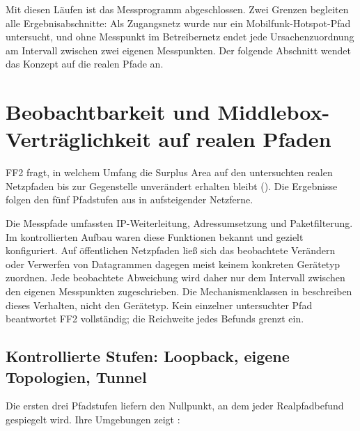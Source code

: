 Mit diesen Läufen ist das Messprogramm abgeschlossen. Zwei Grenzen begleiten alle Ergebnisabschnitte: Als
Zugangsnetz wurde nur ein Mobilfunk-Hotspot-Pfad untersucht, und ohne Messpunkt im Betreibernetz endet
jede Ursachenzuordnung am Intervall zwischen zwei eigenen Messpunkten. Der folgende Abschnitt wendet das
Konzept auf die realen Pfade an.

\section[Beobachtbarkeit und Middlebox-Verträglichkeit auf realen Pfaden]%
{Beobachtbarkeit und Middlebox-\\Verträglichkeit auf realen Pfaden}
\label{sec:beobachtbarkeit-eval}

FF2 fragt, in welchem Umfang die Surplus Area auf den untersuchten realen Netz\-pfaden bis zur Gegenstelle
unverändert erhalten bleibt (). Die Ergebnisse folgen den fünf Pfadstufen aus
 in aufsteigender Netzferne.

Die Messpfade umfassten IP-Weiterleitung, Adressumsetzung und Paketfilterung. Im kontrollierten Aufbau
waren diese Funktionen bekannt und gezielt konfiguriert. Auf öffentlichen Netz\-pfaden ließ sich das
beobachtete Verändern oder Verwerfen von Datagrammen dagegen meist keinem konkreten Gerätetyp zuordnen.
Jede beobachtete Abweichung wird daher nur dem Intervall zwischen den eigenen Messpunkten zugeschrieben.
Die Mechanismenklassen in  beschreiben dieses Verhalten, nicht den
Gerätetyp. Kein einzelner untersuchter Pfad beantwortet FF2 vollständig; die Reichweite jedes Befunds
grenzt  ein.

\subsection{Kontrollierte Stufen: Loopback, eigene Topologien, Tunnel}
\label{subsec:eval-kontrolliert}

Die ersten drei Pfadstufen liefern den Nullpunkt, an dem jeder Realpfadbefund gespiegelt wird. Ihre
Umgebungen zeigt :

